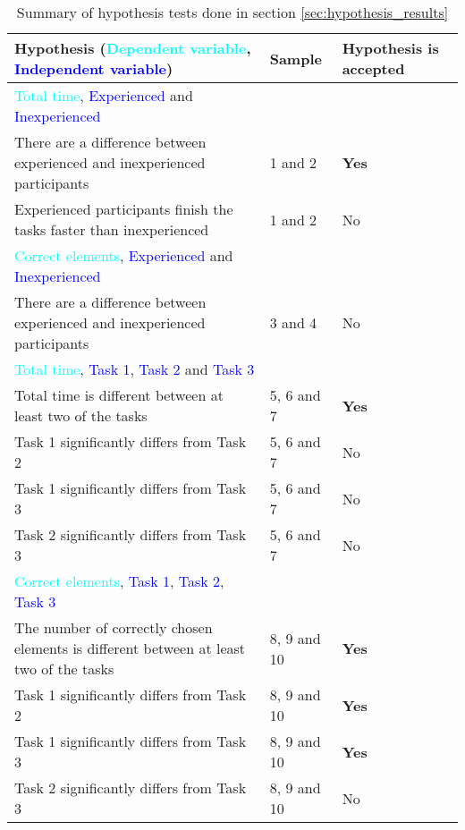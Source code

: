 	\begin{longtable}{p{}|l|p{}}  %
	\caption[Summary, normality tests]{Summary of hypothesis tests done in section \ref{sec:hypothesis_results}} \label{tab:hypothesistest_summary} \\
		Hypothesis (\textcolor{cyan}{Dependent variable}, \textcolor{blue}{Independent variable}) & Sample & Hypothesis is accepted \\[0.2cm] \hline
		\textcolor{cyan}{Total time}, \textcolor{blue}{Experienced} and \textcolor{blue}{Inexperienced} & &  \\
		There are a difference between experienced and inexperienced participants & 1 and 2 & \textbf{Yes} \\
		Experienced participants finish the tasks faster than inexperienced  & 1 and 2 & No   \\ \hline
		\textcolor{cyan}{Correct elements}, \textcolor{blue}{Experienced} and \textcolor{blue}{Inexperienced} & &  \\
		There are a difference between experienced and inexperienced participants & 3 and 4 & No   \\ \hline
		\textcolor{cyan}{Total time}, \textcolor{blue}{Task 1}, \textcolor{blue}{Task 2} and \textcolor{blue}{Task 3}& &  \\
		 Total time is different between at least two of the tasks & 5, 6 and 7 & \textbf{Yes}   \\
		 Task 1 significantly differs from Task 2 & 5, 6 and 7 & No  \\ 
		 Task 1 significantly differs from Task 3 & 5, 6 and 7 & No  \\ 
		 Task 2 significantly differs from Task 3 & 5, 6 and 7 & No  \\ \hline
		\textcolor{cyan}{Correct elements}, \textcolor{blue}{Task 1}, \textcolor{blue}{Task 2}, \textcolor{blue}{Task 3} & &  \\
		The number of correctly chosen elements is different between at least two of the tasks & 8, 9 and 10 & \textbf{Yes}  \\
		Task 1 significantly differs from Task 2 & 8, 9 and 10 & \textbf{Yes}  \\ 
		Task 1 significantly differs from Task 3 & 8, 9 and 10 & \textbf{Yes}  \\ 
		Task 2 significantly differs from Task 3 & 8, 9 and 10 & No  \\ \hline
	\end{longtable}